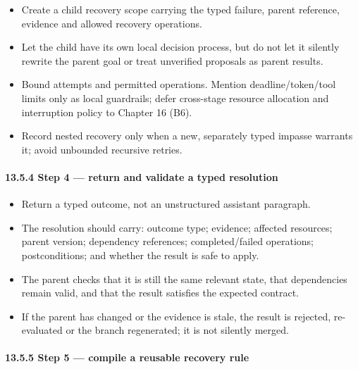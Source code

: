 \begin{itemize}
\tightlist
\item
  Create a child recovery scope carrying the typed failure, parent reference, evidence and allowed recovery operations.
\item
  Let the child have its own local decision process, but do not let it silently rewrite the parent goal or treat unverified proposals as parent results.
\item
  Bound attempts and permitted operations. Mention deadline/token/tool limits only as local guardrails; defer cross-stage resource allocation and interruption policy to Chapter 16 (B6).
\item
  Record nested recovery only when a new, separately typed impasse warrants it; avoid unbounded recursive retries.
\end{itemize}

\paragraph{13.5.4 Step 4 --- return and validate a typed resolution}\label{step-4-return-and-validate-a-typed-resolution}

\begin{itemize}
\tightlist
\item
  Return a typed outcome, not an unstructured assistant paragraph.
\item
  The resolution should carry: outcome type; evidence; affected resources; parent version; dependency references; completed/failed operations; postconditions; and whether the result is safe to apply.
\item
  The parent checks that it is still the same relevant state, that dependencies remain valid, and that the result satisfies the expected contract.
\item
  If the parent has changed or the evidence is stale, the result is rejected, re-evaluated or the branch regenerated; it is not silently merged.
\end{itemize}

\paragraph{13.5.5 Step 5 --- compile a reusable recovery rule}\label{step-5-compile-a-reusable-recovery-rule}

